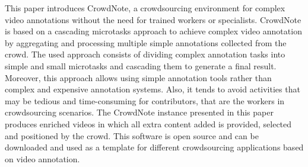 This paper introduces CrowdNote, a crowdsourcing environment for complex video annotations without the need for trained workers or specialists. CrowdNote is based on a cascading microtasks approach to achieve complex video annotation by aggregating and processing multiple simple annotations collected from the crowd. The used approach consists of dividing complex annotation tasks into simple and small microtasks and cascading them to generate a final result. Moreover, this approach allows using simple annotation tools rather than complex and expensive annotation systems. Also, it tends to avoid activities that may be tedious and time-consuming for contributors, that are the workers in crowdsourcing scenarios. The CrowdNote instance presented in this paper produces enriched videos in which all extra content added is provided, selected and positioned by the crowd. This software is open source and can be downloaded and used as a template for different crowdsourcing applications based on video annotation.

